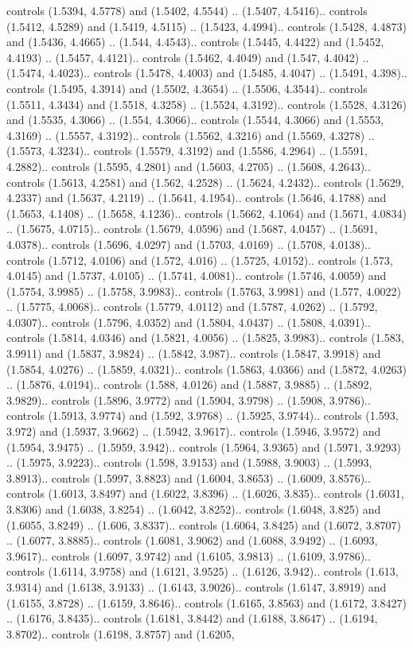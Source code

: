 controls (1.5394, 4.5778) and (1.5402, 4.5544) .. (1.5407, 4.5416).. controls (1.5412, 4.5289) and (1.5419, 4.5115) .. (1.5423, 4.4994).. controls (1.5428, 4.4873) and (1.5436, 4.4665) .. (1.544, 4.4543).. controls (1.5445, 4.4422) and (1.5452, 4.4193) .. (1.5457, 4.4121).. controls (1.5462, 4.4049) and (1.547, 4.4042) .. (1.5474, 4.4023).. controls (1.5478, 4.4003) and (1.5485, 4.4047) .. (1.5491, 4.398).. controls (1.5495, 4.3914) and (1.5502, 4.3654) .. (1.5506, 4.3544).. controls (1.5511, 4.3434) and (1.5518, 4.3258) .. (1.5524, 4.3192).. controls (1.5528, 4.3126) and (1.5535, 4.3066) .. (1.554, 4.3066).. controls (1.5544, 4.3066) and (1.5553, 4.3169) .. (1.5557, 4.3192).. controls (1.5562, 4.3216) and (1.5569, 4.3278) .. (1.5573, 4.3234).. controls (1.5579, 4.3192) and (1.5586, 4.2964) .. (1.5591, 4.2882).. controls (1.5595, 4.2801) and (1.5603, 4.2705) .. (1.5608, 4.2643).. controls (1.5613, 4.2581) and (1.562, 4.2528) .. (1.5624, 4.2432).. controls (1.5629, 4.2337) and (1.5637, 4.2119) .. (1.5641, 4.1954).. controls (1.5646, 4.1788) and (1.5653, 4.1408) .. (1.5658, 4.1236).. controls (1.5662, 4.1064) and (1.5671, 4.0834) .. (1.5675, 4.0715).. controls (1.5679, 4.0596) and (1.5687, 4.0457) .. (1.5691, 4.0378).. controls (1.5696, 4.0297) and (1.5703, 4.0169) .. (1.5708, 4.0138).. controls (1.5712, 4.0106) and (1.572, 4.016) .. (1.5725, 4.0152).. controls (1.573, 4.0145) and (1.5737, 4.0105) .. (1.5741, 4.0081).. controls (1.5746, 4.0059) and (1.5754, 3.9985) .. (1.5758, 3.9983).. controls (1.5763, 3.9981) and (1.577, 4.0022) .. (1.5775, 4.0068).. controls (1.5779, 4.0112) and (1.5787, 4.0262) .. (1.5792, 4.0307).. controls (1.5796, 4.0352) and (1.5804, 4.0437) .. (1.5808, 4.0391).. controls (1.5814, 4.0346) and (1.5821, 4.0056) .. (1.5825, 3.9983).. controls (1.583, 3.9911) and (1.5837, 3.9824) .. (1.5842, 3.987).. controls (1.5847, 3.9918) and (1.5854, 4.0276) .. (1.5859, 4.0321).. controls (1.5863, 4.0366) and (1.5872, 4.0263) .. (1.5876, 4.0194).. controls (1.588, 4.0126) and (1.5887, 3.9885) .. (1.5892, 3.9829).. controls (1.5896, 3.9772) and (1.5904, 3.9798) .. (1.5908, 3.9786).. controls (1.5913, 3.9774) and (1.592, 3.9768) .. (1.5925, 3.9744).. controls (1.593, 3.972) and (1.5937, 3.9662) .. (1.5942, 3.9617).. controls (1.5946, 3.9572) and (1.5954, 3.9475) .. (1.5959, 3.942).. controls (1.5964, 3.9365) and (1.5971, 3.9293) .. (1.5975, 3.9223).. controls (1.598, 3.9153) and (1.5988, 3.9003) .. (1.5993, 3.8913).. controls (1.5997, 3.8823) and (1.6004, 3.8653) .. (1.6009, 3.8576).. controls (1.6013, 3.8497) and (1.6022, 3.8396) .. (1.6026, 3.835).. controls (1.6031, 3.8306) and (1.6038, 3.8254) .. (1.6042, 3.8252).. controls (1.6048, 3.825) and (1.6055, 3.8249) .. (1.606, 3.8337).. controls (1.6064, 3.8425) and (1.6072, 3.8707) .. (1.6077, 3.8885).. controls (1.6081, 3.9062) and (1.6088, 3.9492) .. (1.6093, 3.9617).. controls (1.6097, 3.9742) and (1.6105, 3.9813) .. (1.6109, 3.9786).. controls (1.6114, 3.9758) and (1.6121, 3.9525) .. (1.6126, 3.942).. controls (1.613, 3.9314) and (1.6138, 3.9133) .. (1.6143, 3.9026).. controls (1.6147, 3.8919) and (1.6155, 3.8728) .. (1.6159, 3.8646).. controls (1.6165, 3.8563) and (1.6172, 3.8427) .. (1.6176, 3.8435).. controls (1.6181, 3.8442) and (1.6188, 3.8647) .. (1.6194, 3.8702).. controls (1.6198, 3.8757) and (1.6205, 